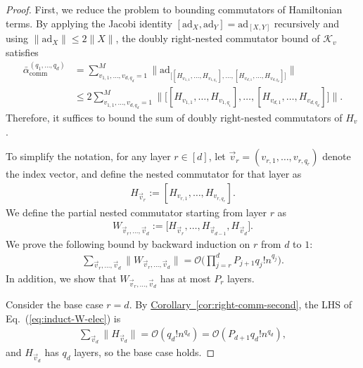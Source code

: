 \documentclass[aps,pra,reprint,groupedaddress,floatfix]{revtex4-2}
\newcommand{\eq}[1]{(\ref{eq:#1})}
\newcommand{\cor}[1]{\hyperref[cor:#1]{Corollary~\ref*{cor:#1}}}
\newcommand{\ad}{\mathrm{ad}}
\renewcommand{\comm}{\mathrm{comm}}
\newcommand{\mc}{\mathcal}
\begin{document}
\begin{proof}
    First, we reduce the problem to bounding commutators of Hamiltonian terms. By applying the Jacobi identity $[\ad_{X}, \ad_Y] = \ad_{[X,Y]}$ recursively and using $\|\ad_X\| \le 2\|X\|$, the doubly right-nested commutator bound of $\mc K_v$ satisfies
    \begin{align*}
    \bar{\alpha}_{\comm}^{(q_1, \ldots, q_{d})}
    &= \sum_{v_{1,1}, \ldots, v_{d, q_{d}} = 1}^M \bigg\| \ad_{\Big[ 
         [H_{v_{1,1}}, \ldots, H_{v_{1,q_1}}], \ldots, 
        [H_{v_{d,1}}, \ldots, H_{v_{d,q_{d}}}]
     \Big]} \bigg\|\\
     &\le 2\sum_{v_{1,1}, \ldots, v_{d, q_{d}} = 1}^M \bigg\|{\Big[ 
         [H_{v_{1,1}}, \ldots, H_{v_{1,q_1}}], \ldots, 
        [H_{v_{d,1}}, \ldots, H_{v_{d,q_{d}}}]
     \Big]} \bigg\|.
    \end{align*}
    Therefore, it suffices to bound the sum of doubly right-nested commutators of $H_v$. 
    
    To simplify the notation, for any layer $r \in [d]$, let $\vec{v}_r = (v_{r,1}, \ldots, v_{r, q_r})$ denote the index vector, and define the nested commutator for that layer as
    \begin{align*}
        H_{\vec{v}_r} := [H_{v_{r,1}}, \ldots, H_{v_{r, q_r}}].
    \end{align*}
    We define the partial nested commutator starting from layer $r$ as
    \begin{align*}
        W_{\vec{v}_{r}, \ldots, \vec{v}_d} := \Big[ H_{\vec{v}_r}, \ldots, H_{\vec{v}_{d-1}}, H_{\vec{v}_d} \Big].
    \end{align*}
    We prove the following bound by backward induction on $r$ from $d$ to $1$:
    \begin{align} \label{eq:induct-W-elec}
        \sum_{\vec{v}_{r}, \ldots, \vec{v}_{d}} \Big\|W_{\vec{v}_{r}, \ldots, \vec{v}_d}\Big\| = \mathcal{O}\bigg(\prod_{j=r}^{d}P_{j+1} q_j! n^{q_j}\bigg).
    \end{align} In addition, we show that $W_{\vec{v}_{r}, \ldots, \vec{v}_d}$ has at most $P_r$ layers.  
    
    Consider the base case $r=d$. By \cor{right-comm-second}, the LHS of Eq.~\eq{induct-W-elec} is \begin{align*}
        \sum_{\vec{v}_d} \|H_{\vec{v}_d}\| = \mc{O}(q_d ! n^{q_d}) = \mc{O}(P_{d+1}q_d ! n^{q_d}),
    \end{align*} and $H_{\vec{v}_d}$ has $q_d$ layers, so the base case holds. 


\end{proof}
\end{document}
